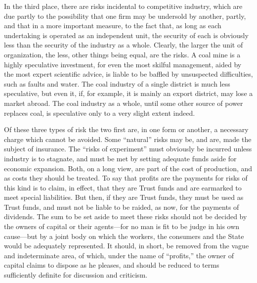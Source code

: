 \documentclass{book}
\begin{document}
In the third place, there are risks incidental to competitive industry, which are due partly to the possibility that one firm may be undersold by another, partly, and that in a more important measure, to the fact that, as long as each undertaking is operated as an independent unit, the security of each is obviously less than the security of the industry as a whole. Clearly, the larger the unit of organization, the less, other things being equal, are the risks. A coal mine is a highly speculative investment, for even the most skilful management, aided by the most expert scientific advice, is liable to be baffled by unsuspected difficulties, such as faults and water. The coal industry of a single district is much less speculative, but even it, if, for example, it is mainly an export district, may lose a market abroad. The coal industry as a whole, until some other source of power replaces coal, is speculative only to a very slight extent indeed.

Of these three types of risk the two first are, in one form or another, a necessary charge which cannot be avoided. Some “natural” risks may be, and are, made the subject of insurance. The “risks of experiment” must obviously be incurred unless industry is to stagnate, and must be met by setting adequate funds aside for economic expansion. Both, on a long view, are part of the cost of production, and as costs they should be treated. To say that profits are the payments for risks of this kind is to claim, in effect, that they are Trust funds and are earmarked to meet special liabilities. But then, if they are Trust funds, they must be used as Trust funds, and must not be liable to be raided, as now, for the payments of dividends. The sum to be set aside to meet these risks should not be decided by the owners of capital or their agents—for no man is fit to be judge in his own cause—but by a joint body on which the workers, the consumers and the State would be adequately represented. It should, in short, be removed from the vague and indeterminate area, of which, under the name of “profits,” the owner of capital claims to dispose as he pleases, and should be reduced to terms sufficiently definite for discussion and criticism.
\end{document}
